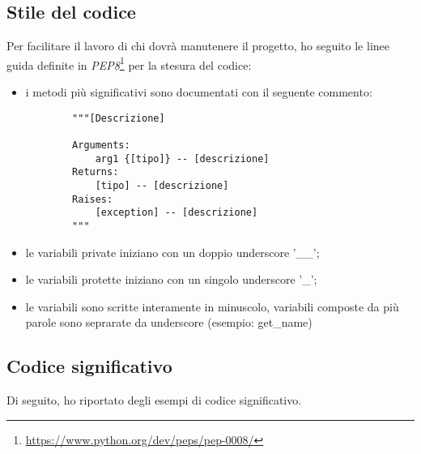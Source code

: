 \subsection{Stile del codice}
Per facilitare il lavoro di chi dovrà manutenere il progetto, ho seguito le linee guida definite in \textit{PEP8}\footnote{\url{https://www.python.org/dev/peps/pep-0008/}} per la stesura del codice:
\begin{itemize}
    \item i metodi più significativi sono documentati con il seguente commento:
    \begin{lstlisting}
        """[Descrizione]

        Arguments:
            arg1 {[tipo]} -- [descrizione]
        Returns:
            [tipo] -- [descrizione]
        Raises:
            [exception] -- [descrizione]
        """
    \end{lstlisting}
    \item le variabili private iniziano con un doppio underscore '\_\_';
    \item le variabili protette iniziano con un singolo underscore '\_';
    \item le variabili sono scritte interamente in minuscolo, variabili composte da più parole sono seprarate da underscore (esempio: get\_name)
\end{itemize}

\subsection{Codice significativo}

Di seguito, ho riportato degli esempi di codice significativo.
